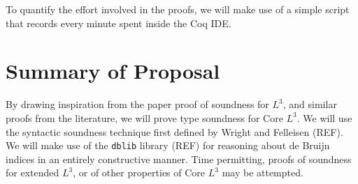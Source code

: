 \documentclass[]{unswthesis}
\begin{document}
To quantify the effort involved in the proofs, we will make use of a simple script that records every minute spent inside the Coq IDE.

\section{Summary of Proposal}

By drawing inspiration from the paper proof of soundness for $L^3$, and similar proofs from the literature, we will prove type soundness for Core $L^3$. We will use the syntactic soundness technique first defined by Wright and Felleisen (REF). We will make use of the \texttt{dblib} library (REF) for reasoning about de Bruijn indices in an entirely constructive manner. Time permitting, proofs of soundness for extended $L^3$, or of other properties of Core $L^3$ may be attempted.

\backmatter


\end{document}
